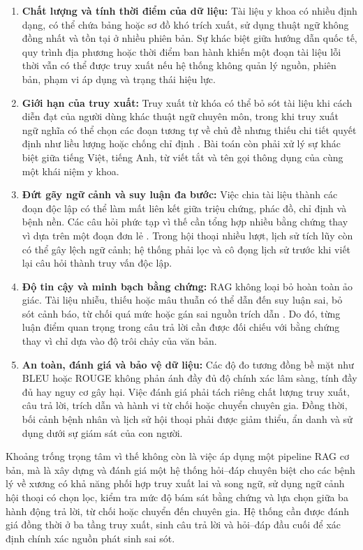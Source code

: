 \begin{enumerate}[label=(\arabic*)]
    \item \textbf{Chất lượng và tính thời điểm của dữ liệu:} Tài liệu y khoa có nhiều định dạng, có thể chứa bảng hoặc sơ đồ khó trích xuất, sử dụng thuật ngữ không đồng nhất và tồn tại ở nhiều phiên bản. Sự khác biệt giữa hướng dẫn quốc tế, quy trình địa phương hoặc thời điểm ban hành khiến một đoạn tài liệu lỗi thời vẫn có thể được truy xuất nếu hệ thống không quản lý nguồn, phiên bản, phạm vi áp dụng và trạng thái hiệu lực.

    \item \textbf{Giới hạn của truy xuất:} Truy xuất từ khóa có thể bỏ sót tài liệu khi cách diễn đạt của người dùng khác thuật ngữ chuyên môn, trong khi truy xuất ngữ nghĩa có thể chọn các đoạn tương tự về chủ đề nhưng thiếu chi tiết quyết định như liều lượng hoặc chống chỉ định \cite{medrag2024, xiong2024mirage}. Bài toán còn phải xử lý sự khác biệt giữa tiếng Việt, tiếng Anh, từ viết tắt và tên gọi thông dụng của cùng một khái niệm y khoa.

    \item \textbf{Đứt gãy ngữ cảnh và suy luận đa bước:} Việc chia tài liệu thành các đoạn độc lập có thể làm mất liên kết giữa triệu chứng, phác đồ, chỉ định và bệnh nền. Các câu hỏi phức tạp vì thế cần tổng hợp nhiều bằng chứng thay vì dựa trên một đoạn đơn lẻ \cite{imedrag}. Trong hội thoại nhiều lượt, lịch sử tích lũy còn có thể gây lệch ngữ cảnh; hệ thống phải lọc và cô đọng lịch sử trước khi viết lại câu hỏi thành truy vấn độc lập.

    \item \textbf{Độ tin cậy và minh bạch bằng chứng:} RAG không loại bỏ hoàn toàn ảo giác. Tài liệu nhiễu, thiếu hoặc mâu thuẫn có thể dẫn đến suy luận sai, bỏ sót cảnh báo, từ chối quá mức hoặc gán sai nguồn trích dẫn \cite{medtrustrag, xiong2024mirage}. Do đó, từng luận điểm quan trọng trong câu trả lời cần được đối chiếu với bằng chứng thay vì chỉ dựa vào độ trôi chảy của văn bản.

    \item \textbf{An toàn, đánh giá và bảo vệ dữ liệu:} Các độ đo tương đồng bề mặt như BLEU hoặc ROUGE không phản ánh đầy đủ độ chính xác lâm sàng, tính đầy đủ hay nguy cơ gây hại. Việc đánh giá phải tách riêng chất lượng truy xuất, câu trả lời, trích dẫn và hành vi từ chối hoặc chuyển chuyên gia. Đồng thời, bối cảnh bệnh nhân và lịch sử hội thoại phải được giảm thiểu, ẩn danh và sử dụng dưới sự giám sát của con người.
\end{enumerate}

Khoảng trống trọng tâm vì thế không còn là việc áp dụng một pipeline RAG cơ bản, mà là xây dựng và đánh giá một hệ thống hỏi--đáp chuyên biệt cho các bệnh lý về xương có khả năng phối hợp truy xuất lai và song ngữ, sử dụng ngữ cảnh hội thoại có chọn lọc, kiểm tra mức độ bám sát bằng chứng và lựa chọn giữa ba hành động trả lời, từ chối hoặc chuyển đến chuyên gia. Hệ thống cần được đánh giá đồng thời ở ba tầng truy xuất, sinh câu trả lời và hỏi--đáp đầu cuối để xác định chính xác nguồn phát sinh sai sót.
